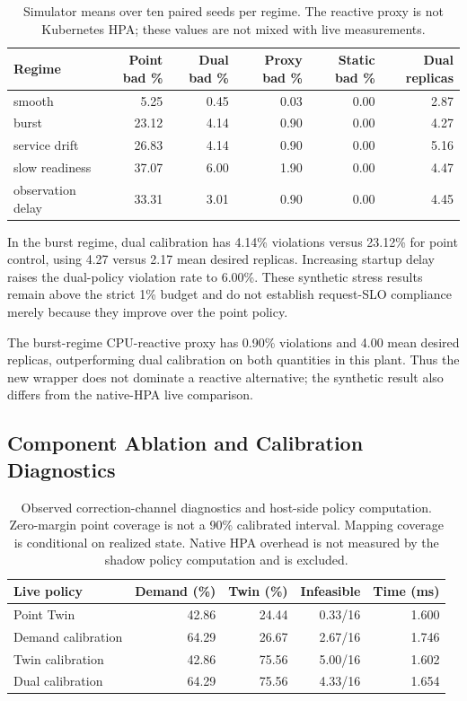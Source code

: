 \documentclass[11pt,a4paper]{article}
\begin{document}
\begin{table}[htbp]\centering\small\setlength{\tabcolsep}{4pt}
\caption{Simulator means over ten paired seeds per regime. The reactive proxy is not Kubernetes HPA; these values are not mixed with live measurements.}\label{tab:sim}
\begin{tabular}{lrrrrr}\toprule
Regime & Point bad \% & Dual bad \% & Proxy bad \% & Static bad \% & Dual replicas\\\midrule
smooth & 5.25 & 0.45 & 0.03 & 0.00 & 2.87\\
burst & 23.12 & 4.14 & 0.90 & 0.00 & 4.27\\
service drift & 26.83 & 4.14 & 0.90 & 0.00 & 5.16\\
slow readiness & 37.07 & 6.00 & 1.90 & 0.00 & 4.47\\
observation delay & 33.31 & 3.01 & 0.90 & 0.00 & 4.45\\
\bottomrule\end{tabular}\end{table}

In the burst regime, dual calibration has 4.14\% violations versus 23.12\% for point control, using 4.27 versus 2.17 mean desired replicas. Increasing startup delay raises the dual-policy violation rate to 6.00\%. These synthetic stress results remain above the strict 1\% budget and do not establish request-SLO compliance merely because they improve over the point policy.

The burst-regime CPU-reactive proxy has 0.90\% violations and 4.00 mean desired replicas, outperforming dual calibration on both quantities in this plant. Thus the new wrapper does not dominate a reactive alternative; the synthetic result also differs from the native-HPA live comparison.

\subsection{Component Ablation and Calibration Diagnostics}

\begin{table}[htbp]\centering\small\setlength{\tabcolsep}{4pt}
\caption{Observed correction-channel diagnostics and host-side policy computation. Zero-margin point coverage is not a 90\% calibrated interval. Mapping coverage is conditional on realized state. Native HPA overhead is not measured by the shadow policy computation and is excluded.}\label{tab:diag}
\begin{tabular}{lrrrr}\toprule
Live policy & Demand (\%) & Twin (\%) & Infeasible & Time (ms)\\\midrule
Point Twin & 42.86 & 24.44 & 0.33/16 & 1.600\\
Demand calibration & 64.29 & 26.67 & 2.67/16 & 1.746\\
Twin calibration & 42.86 & 75.56 & 5.00/16 & 1.602\\
Dual calibration & 64.29 & 75.56 & 4.33/16 & 1.654\\
\bottomrule\end{tabular}\end{table}
\end{document}
